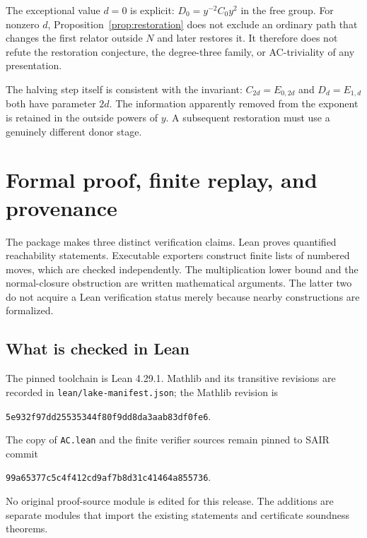 \documentclass[11pt]{article}
\theoremstyle{definition}\newtheorem{definition}[theorem]{Definition}
\theoremstyle{remark}\newtheorem{remark}[theorem]{Remark}
\begin{document}
The exceptional value $d=0$ is explicit: $D_0=y^{-2}C_0y^2$ in the free group. For nonzero $d$, Proposition~\ref{prop:restoration} does not exclude an ordinary path that changes the first relator outside $N$ and later restores it. It therefore does not refute the restoration conjecture, the degree-three family, or AC-triviality of any presentation.

The halving step itself is consistent with the invariant: $C_{2d}=E_{0,2d}$ and $D_d=E_{1,d}$ both have parameter $2d$. The information apparently removed from the exponent is retained in the outside powers of $y$. A subsequent restoration must use a genuinely different donor stage.

\section{Formal proof, finite replay, and provenance}\label{sec:verification}
The package makes three distinct verification claims. Lean proves quantified reachability statements. Executable exporters construct finite lists of numbered moves, which are checked independently. The multiplication lower bound and the normal-closure obstruction are written mathematical arguments. The latter two do not acquire a Lean verification status merely because nearby constructions are formalized.

\subsection{What is checked in Lean}
The pinned toolchain is Lean 4.29.1. Mathlib and its transitive revisions are recorded in \texttt{lean/lake-manifest.json}; the Mathlib revision is
\begin{center}\small\texttt{5e932f97dd25535344f80f9dd8da3aab83df0fe6}.
\end{center}
The copy of \texttt{AC.lean} and the finite verifier sources remain pinned to SAIR commit
\begin{center}\small\texttt{99a65377c5c4f412cd9af7b8d31c41464a855736}.
\end{center}
No original proof-source module is edited for this release. The additions are separate modules that import the existing statements and certificate soundness theorems.
\end{document}
